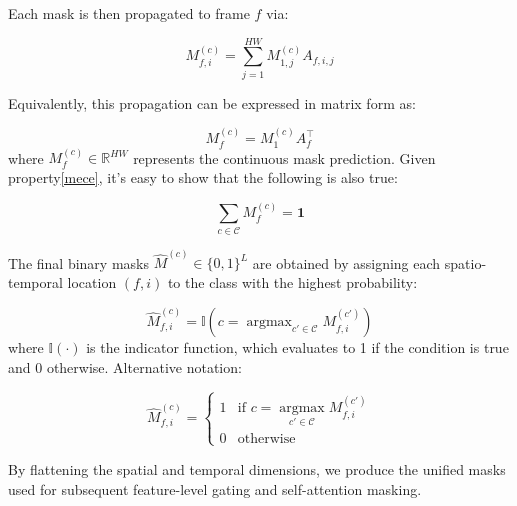 \documentclass{article}
\begin{document}
Each mask is then propagated to frame $f$ via:

\begin{equation}
    M_{f,i}^{(c)} = \sum_{j=1}^{HW} M_{1,j}^{(c)} A_{f,i,j}
\end{equation}

Equivalently, this propagation can be expressed in matrix form as:

\begin{equation}
    M_f^{(c)} = M_1^{(c)} A_f^\top
\end{equation}
where $M_f^{(c)} \in \mathbb{R}^{HW}$ represents the continuous mask prediction. Given property\eqref{mece}, it's easy to show that the following is also true:

\begin{equation}
    \sum_{c\in\mathcal{C}} M_f^{(c)} = \mathbf{1}
\end{equation}

The final binary masks $\hat{M}^{(c)} \in \{0, 1\}^{L}$ are obtained by assigning each spatio-temporal location $(f, i)$ to the class with the highest probability:

\begin{equation}
  \hat{M}_{f,i}^{(c)} = \mathbb{I} \left( c = \mathop{\arg\max}_{c' \in \mathcal{C}} M_{f,i}^{(c')} \right)
\end{equation}
where $\mathbb{I}(\cdot)$ is the indicator function, which evaluates to 1 if the condition is true and 0 otherwise.
Alternative notation:

\begin{equation}
  \hat{M}_{f,i}^{(c)} =
  \begin{cases}
    1 & \text{if } c = \underset{c' \in \mathcal{C}}{\operatorname*{argmax}}  M_{f,i}^{(c')} \\
    0 & \text{otherwise}
  \end{cases}
\end{equation}

By flattening the spatial and temporal dimensions, we produce the unified masks used for subsequent feature-level gating and self-attention masking.

\end{document}
